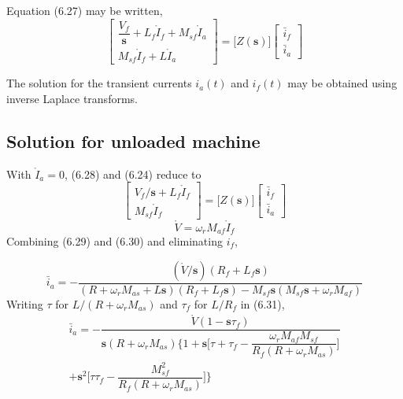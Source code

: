 \documentclass[a4paper,numbers=noenddot,12pt]{scrbook}
\begin{document}
        Equation (6.27) may be written,
        \begin{equation}
            \begin{bmatrix}
                \dfrac{V_f}{\textbf{s}} + L_f \mathring I_f + M_{sf} \mathring I_a \\[2ex]
                M_{sf} \mathring I_f + L \mathring I_a
            \end{bmatrix}
            =
            \Bigg[ Z(\textbf{s})\Bigg]
            \begin{bmatrix}
                \bar i_f \\ \bar i_a %
            \end{bmatrix}
            \label{}
        \end{equation}

        The solution for the transient currents $i_a(t)$ and $i_f(t)$ may be obtained using inverse Laplace transforms.

        \subsection{Solution for unloaded machine}
        With $\mathring I_a =0$, (6.28) and (6.24) reduce to
        \begin{equation}
            \begin{bmatrix}
                V_f/\textbf{s} + L_f \mathring I_f \\[2ex]
                M_{sf} \mathring I_f 
            \end{bmatrix}
            =
            \Bigg[ Z(\textbf{s})\Bigg]
            \begin{bmatrix}
                \bar i_f \\ \bar i_a %
            \end{bmatrix}
            \label{}
        \end{equation}
        \begin{equation}
            \mathring V = \omega_r M_{af} \mathring I_f
            \label{}
        \end{equation}
        Combining (6.29) and (6.30) and eliminating $i_f$,

        \begin{equation}
            \bar i_a = - \dfrac{(\mathring V/\mathbf s)(R_f + L_f \mathbf s)}{(R + \omega_r M_{as}+L \mathbf s)(R_f + L_f \mathbf s) - M_{sf} \textbf{s} ( M_{sf} \textbf{s} + \omega_r M_{af})} %
            \label{}
        \end{equation}
        Writing $\tau$ for $L / (R + \omega_r M_{as})$ and $\tau_f$ for $L/R_f$ in (6.31),
        \begin{multline}
            \bar i_a = - \dfrac{\mathring V(1-\textbf{s}\tau_f)}{\textbf{s}(R + \omega_r M_{as}) \bigg\{1 + \textbf{s} \bigg[\tau + \tau_f - \dfrac{\omega_r M_{af} M_{sf}}{R_f (R + \omega_r M_{as})} \bigg]} \\ %
            + \textbf{s}^2 \bigg[\tau \tau_f - \dfrac{M_{sf}^2}{R_f(R + \omega_r M_{as})}\bigg]\bigg\}
            \label{}
        \end{multline}
\end{document}
